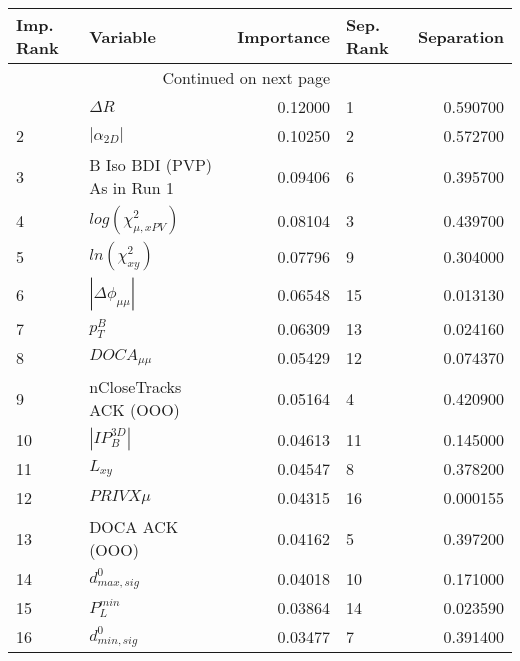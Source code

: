\usepackage{lscape}

\begin{landscape}
\begin{longtable}{llrlr}
\toprule
Imp. Rank &                     Variable &  Importance & Sep. Rank &  Separation \\
\midrule
\endhead
\midrule
\multicolumn{3}{r}{{Continued on next page}} \\
\midrule
\endfoot

\bottomrule
\endlastfoot
        1 &                   $\Delta R$ &     0.12000 &         1 &    0.590700 \\
        2 &              $|\alpha_{2D}|$ &     0.10250 &         2 &    0.572700 \\
        3 &  B Iso BDI (PVP) As in Run 1 &     0.09406 &         6 &    0.395700 \\
        4 &    $log(\chi^{2}_{\mu,xPV})$ &     0.08104 &         3 &    0.439700 \\
        5 &          $ln(\chi^{2}_{xy})$ &     0.07796 &         9 &    0.304000 \\
        6 &     $|\Delta \phi_{\mu\mu}|$ &     0.06548 &        15 &    0.013130 \\
        7 &                    $p^B_{T}$ &     0.06309 &        13 &    0.024160 \\
        8 &              $DOCA_{\mu\mu}$ &     0.05429 &        12 &    0.074370 \\
        9 &       nCloseTracks ACK (OOO) &     0.05164 &         4 &    0.420900 \\
       10 &              $|IP_{B}^{3D}|$ &     0.04613 &        11 &    0.145000 \\
       11 &                     $L_{xy}$ &     0.04547 &         8 &    0.378200 \\
       12 &                   $PRIVX\mu$ &     0.04315 &        16 &    0.000155 \\
       13 &               DOCA ACK (OOO) &     0.04162 &         5 &    0.397200 \\
       14 &             $d^0_{max, sig}$ &     0.04018 &        10 &    0.171000 \\
       15 &                $P^{min}_{L}$ &     0.03864 &        14 &    0.023590 \\
       16 &             $d^0_{min, sig}$ &     0.03477 &         7 &    0.391400 \\
\end{longtable}

\end{landscape}
